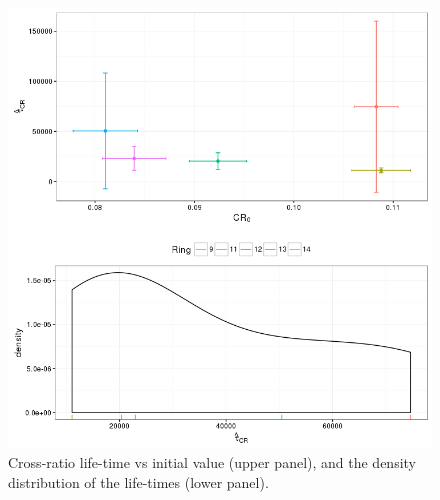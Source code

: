 \documentclass{article}
\begin{document}
\begin{figure}[h]
	\centering
	\includegraphics[scale=.8]{PolAna-CRLTvsCR0}
	\caption{Cross-ratio life-time vs initial value (upper panel), and the density distribution of the life-times (lower panel).\label{fig:R-SepRings}}
\end{figure}
\end{document}
